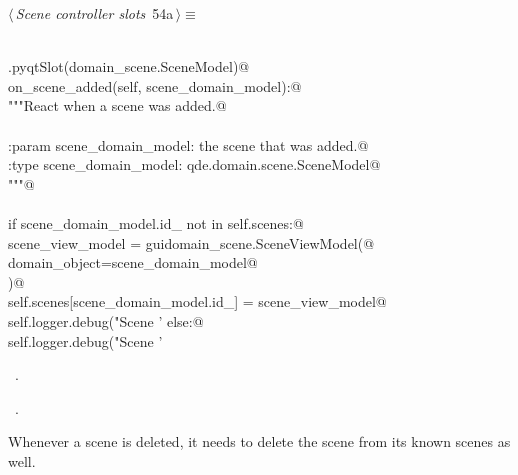 \documentclass[
    a4paper,      %
    10pt,         %
    openright,    %
    notitlepage,  %
    parskip=half, %
]{scrreprt}       %
\theoremstyle{definition}                    %
\begin{document}
\begin{flushleft} \small
\begin{minipage}{\linewidth}\label{scrap84}\raggedright\small
{} $\langle\,${\itshape Scene controller slots}\nobreak\ {\footnotesize {54a}}$\,\rangle\equiv$
\vspace{-1ex}
\begin{list}{}{} \item
\mbox{}\lstinline@@\\
\mbox{}\lstinline@QtCore.pyqtSlot(domain_scene.SceneModel)@\\
\mbox{}\lstinline@def on_scene_added(self, scene_domain_model):@\\
\mbox{}\lstinline@    """React when a scene was added.@\\
\mbox{}\lstinline@@\\
\mbox{}\lstinline@    :param scene_domain_model: the scene that was added.@\\
\mbox{}\lstinline@    :type scene_domain_model:  qde.domain.scene.SceneModel@\\
\mbox{}\lstinline@    """@\\
\mbox{}\lstinline@@\\
\mbox{}\lstinline@    if scene_domain_model.id_ not in self.scenes:@\\
\mbox{}\lstinline@        scene_view_model = guidomain_scene.SceneViewModel(@\\
\mbox{}\lstinline@            domain_object=scene_domain_model@\\
\mbox{}\lstinline@        )@\\
\mbox{}\lstinline@        self.scenes[scene_domain_model.id_] = scene_view_model@\\
\mbox{}\lstinline@        self.logger.debug("Scene '%s' was added" % scene_view_model)@\\
\mbox{}\lstinline@    else:@\\
\mbox{}\lstinline@        self.logger.debug("Scene '%s' already known" % scene)@\\
\mbox{}\lstinline@@{\NWsep}
\end{list}
\vspace{-1.5ex}
\footnotesize
\begin{list}{}{\setlength{\itemsep}{-\parsep}\setlength{\itemindent}{-\leftmargin}}
\item \NWtxtMacroDefBy\ .
\item \NWtxtMacroRefIn\ .

\item{}
\end{list}
\end{minipage}\vspace{4ex}
\end{flushleft}
Whenever a scene is deleted, it needs to delete the scene from its known scenes
as well.
\end{document}
